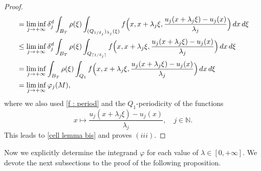 \documentclass{article}
\theoremstyle{definition}
\newcommand{\f}{\varphi}
\newcommand{\dej}{\delta_j}
\newcommand{\N}{\mathbb{N}}
\begin{document}
\begin{proof}
\begin{align*}
    & = \liminf_{j\to+\infty} \dej^d \int_{B_T} \rho(\xi)\int_{(Q_{1/\dej})_{\lambda_j}(\xi)} f\Bigl(x,x+\lambda_j\xi,\frac{u_j(x+\lambda_j\xi)-u_j(x)}{\lambda_j}\Bigr)\, dx\,d\xi \\
    & \leq \liminf_{j\to+\infty} \dej^d \int_{B_T} \rho(\xi)\int_{Q_{\lceil 1/\dej \rceil}} f\Bigl(x,x+\lambda_j\xi,\frac{u_j(x+\lambda_j\xi)-u_j(x)}{\lambda_j}\Bigr)\, dx\,d\xi \\
    & =  \liminf_{j\to+\infty} \int_{B_T} \rho(\xi)\int_{Q_1} f\Bigl(x,x+\lambda_j\xi,\frac{u_j(x+\lambda_j\xi)-u_j(x)}{\lambda_j}\Bigr)\, dx\,d\xi \\
    & = \liminf_{j\to+\infty}\f_j(M),
     \end{align*}
where we also used \eqref{f : period} and the $Q_1$-periodicity of the functions
\begin{equation*}
    x\mapsto \frac{u_j(x+\lambda_j\xi)-u_j(x)}{\lambda_j}, \quad j\in\N.
\end{equation*}
This leads to \eqref{cell lemma bis} and proves $(iii)$.
\end{proof}

Now we explicitly determine the integrand $\f$ for each value of $\lambda\in[0,+\infty]$. We devote the next subsections to the proof of the following proposition.
\end{document}
